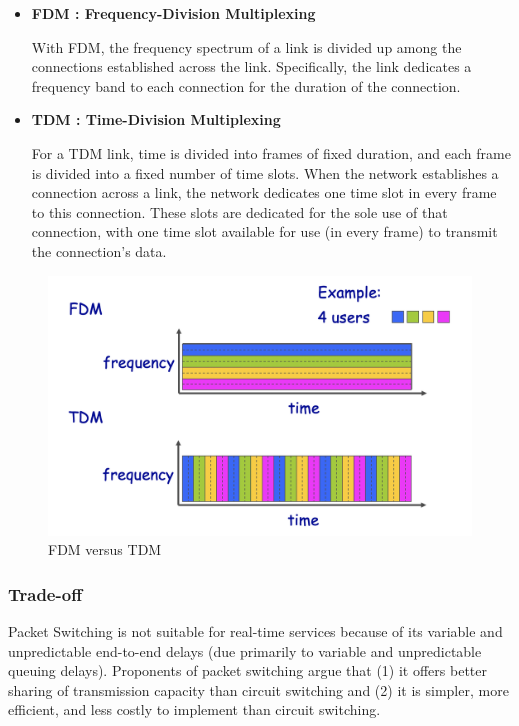 \documentclass[11pt]{article}
\begin{document}
\begin{itemize}
	\item \textbf{FDM : Frequency-Division Multiplexing}
	
	With FDM, the frequency spectrum of a link is divided up among the connections established across the link. Specifically, the link dedicates a frequency band to each connection for the duration of the connection.
	
	\item \textbf{TDM : Time-Division Multiplexing}
	
	For a TDM link, time is divided into frames of fixed duration, and each frame is divided into a fixed number of time slots. When the network establishes a connection across a link, the network dedicates one time slot in every frame to this connection. These slots are dedicated for the sole use of that connection, with one time slot available for use (in every frame) to transmit the connection’s data.
	
\end{itemize} 
	
\begin{figure}[h]
	\centering
	\includegraphics[width=0.8\linewidth]{images/FDMvsTDM.png}
	\caption{FDM versus TDM}
	\label{fig:FDMvsTDM}
\end{figure}

\subsubsection{Trade-off}

Packet Switching is not suitable for real-time services because of its variable and unpredictable end-to-end delays (due primarily to variable and unpredictable queuing delays). Proponents of packet switching argue that (1) it offers better sharing of transmission capacity than circuit switching and (2) it is simpler, more efficient, and less costly to implement than circuit switching.
\end{document}
